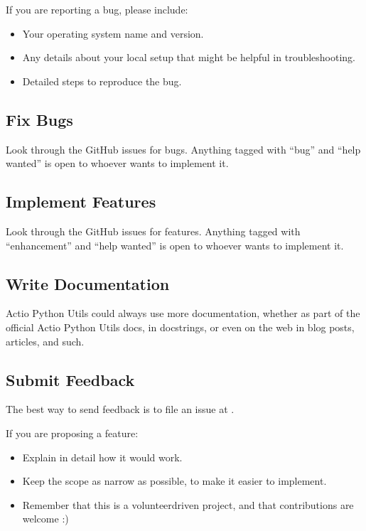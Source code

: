 \documentclass[letterpaper,10pt,english]{sphinxmanual}
\begin{document}
\sphinxAtStartPar
If you are reporting a bug, please include:
\begin{itemize}
\item {} 
\sphinxAtStartPar
Your operating system name and version.

\item {} 
\sphinxAtStartPar
Any details about your local setup that might be helpful in troubleshooting.

\item {} 
\sphinxAtStartPar
Detailed steps to reproduce the bug.

\end{itemize}


\subsection{Fix Bugs}
\label{\detokenize{contributing:fix-bugs}}
\sphinxAtStartPar
Look through the GitHub issues for bugs. Anything tagged with “bug” and “help
wanted” is open to whoever wants to implement it.


\subsection{Implement Features}
\label{\detokenize{contributing:implement-features}}
\sphinxAtStartPar
Look through the GitHub issues for features. Anything tagged with “enhancement”
and “help wanted” is open to whoever wants to implement it.


\subsection{Write Documentation}
\label{\detokenize{contributing:write-documentation}}
\sphinxAtStartPar
Actio Python Utils could always use more documentation, whether as part of the
official Actio Python Utils docs, in docstrings, or even on the web in blog posts,
articles, and such.


\subsection{Submit Feedback}
\label{\detokenize{contributing:submit-feedback}}
\sphinxAtStartPar
The best way to send feedback is to file an issue at .

\sphinxAtStartPar
If you are proposing a feature:
\begin{itemize}
\item {} 
\sphinxAtStartPar
Explain in detail how it would work.

\item {} 
\sphinxAtStartPar
Keep the scope as narrow as possible, to make it easier to implement.

\item {} 
\sphinxAtStartPar
Remember that this is a volunteer\sphinxhyphen{}driven project, and that contributions
are welcome :)

\end{itemize}
\end{document}
